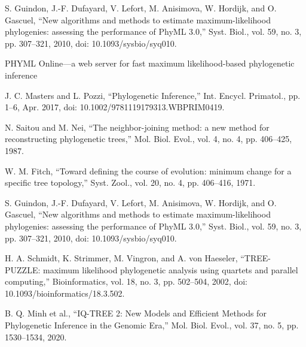 \documentclass[12pt]{report}
\begin{document}
\begin{thebibliography}{10}
	S. Guindon, J.-F. Dufayard, V. Lefort, M. Anisimova, W. Hordijk, and O. Gascuel, “New algorithms and methods to estimate maximum-likelihood phylogenies: assessing the performance of PhyML 3.0,” Syst. Biol., vol. 59, no. 3, pp. 307–321, 2010, doi: 10.1093/sysbio/syq010.
	
	PHYML Online—a web server for fast maximum likelihood-based phylogenetic inference
	
	J. C. Masters and L. Pozzi, “Phylogenetic Inference,” Int. Encycl. Primatol., pp. 1–6, Apr. 2017, doi: 10.1002/9781119179313.WBPRIM0419.
	
	N. Saitou and M. Nei, “The neighbor-joining method: a new method for reconstructing phylogenetic trees,” Mol. Biol. Evol., vol. 4, no. 4, pp. 406–425, 1987.
	
	W. M. Fitch, “Toward defining the course of evolution: minimum change for a specific tree topology,” Syst. Zool., vol. 20, no. 4, pp. 406–416, 1971.
	
	S. Guindon, J.-F. Dufayard, V. Lefort, M. Anisimova, W. Hordijk, and O. Gascuel, “New algorithms and methods to estimate maximum-likelihood phylogenies: assessing the performance of PhyML 3.0,” Syst. Biol., vol. 59, no. 3, pp. 307–321, 2010, doi: 10.1093/sysbio/syq010.
	
	H. A. Schmidt, K. Strimmer, M. Vingron, and A. von Haeseler, “TREE-PUZZLE: maximum likelihood phylogenetic analysis using quartets and parallel computing,” Bioinformatics, vol. 18, no. 3, pp. 502–504, 2002, doi: 10.1093/bioinformatics/18.3.502.
	
	B. Q. Minh et al., “IQ-TREE 2: New Models and Efficient Methods for Phylogenetic Inference in the Genomic Era,” Mol. Biol. Evol., vol. 37, no. 5, pp. 1530–1534, 2020.
\end{thebibliography}
\end{document}
